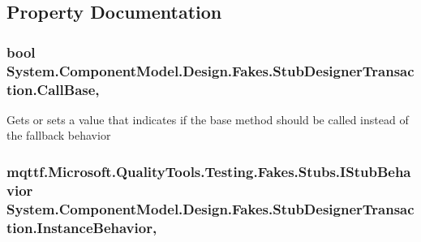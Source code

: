 \subsection{Property Documentation}
\hypertarget{class_system_1_1_component_model_1_1_design_1_1_fakes_1_1_stub_designer_transaction_ae23758d21a9026faa0e72d2decfb97fd}{
\subsubsection[{Call\-Base}]{\setlength{\rightskip}{0pt plus 5cm}bool System.\-Component\-Model.\-Design.\-Fakes.\-Stub\-Designer\-Transaction.\-Call\-Base\hspace{0.3cm}{\ttfamily [get]}, {\ttfamily [set]}}}\label{class_system_1_1_component_model_1_1_design_1_1_fakes_1_1_stub_designer_transaction_ae23758d21a9026faa0e72d2decfb97fd}


Gets or sets a value that indicates if the base method should be called instead of the fallback behavior

\hypertarget{class_system_1_1_component_model_1_1_design_1_1_fakes_1_1_stub_designer_transaction_abd8526f281b84ad0eefe75ae77ac53ca}{
\subsubsection[{Instance\-Behavior}]{\setlength{\rightskip}{0pt plus 5cm}mqttf.\-Microsoft.\-Quality\-Tools.\-Testing.\-Fakes.\-Stubs.\-I\-Stub\-Behavior System.\-Component\-Model.\-Design.\-Fakes.\-Stub\-Designer\-Transaction.\-Instance\-Behavior\hspace{0.3cm}{\ttfamily [get]}, {\ttfamily [set]}}}\label{class_system_1_1_component_model_1_1_design_1_1_fakes_1_1_stub_designer_transaction_abd8526f281b84ad0eefe75ae77ac53ca}


